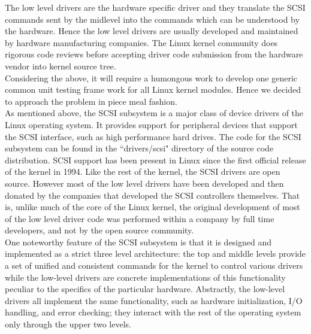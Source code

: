 The low level drivers are the hardware specific driver and they translate the SCSI commands sent by the midlevel into the commands which can be understood by the hardware.  Hence the low level drivers are usually developed and maintained by hardware manufacturing companies. The Linux kernel community does rigorous code reviews before accepting driver code submission from the hardware vendor into kernel source tree.  \\

Considering the above, it will require a humongous work to develop one generic common unit testing frame work for all Linux kernel modules. Hence we decided to approach the problem in piece meal fashion.\\

As mentioned above, the SCSI subsystem is a major class of device drivers of the Linux operating system. It provides support for peripheral devices that support the SCSI interface, such as high performance hard drives. The code for the SCSI subsystem can be found in the ``drivers/scsi" directory of the source code distribution. SCSI support has been present in Linux since the first official release of the kernel in 1994. Like the rest of the kernel, the SCSI drivers are open source. However most of the low level drivers have been developed and then donated by the companies that developed the SCSI controllers themselves. That is, unlike much of the core of the Linux kernel, the original development of most of the low level driver code was performed within a company by full time developers, and not by the open source community. \\

One noteworthy feature of the SCSI subsystem is that it is designed and implemented as a strict three level architecture: the top and middle levels provide a set of unified and consistent commands for the kernel to control various drivers while the low-level drivers are concrete implementations of this functionality peculiar to the specifics of the particular hardware. Abstractly, the low-level drivers all implement the same functionality, such as hardware initialization, I/O handling, and error checking; they interact with the rest of the operating system only through the upper two levels.\\

